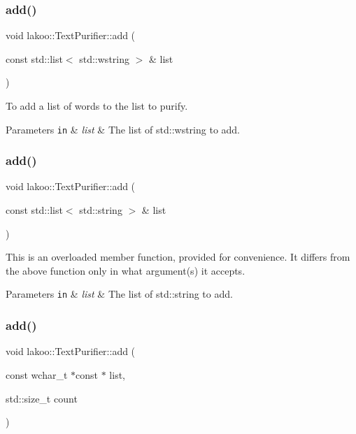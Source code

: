 \subsubsection{\texorpdfstring{add()}{add()}\hspace{0.1cm}{\footnotesize\ttfamily [5/8]}}
{\footnotesize\ttfamily void lakoo\+::\+Text\+Purifier\+::add (\begin{DoxyParamCaption}\item[{const std\+::list$<$ std\+::wstring $>$ \&}]{list }\end{DoxyParamCaption})}



To add a list of words to the list to purify. 


\begin{DoxyParams}[1]{Parameters}
\mbox{\tt in}  & {\em list} & The list of std\+::wstring to add. \\
\hline
\end{DoxyParams}
\mbox{\label{classlakoo_1_1_text_purifier_ab5329c055bac1d28a85e16c90bab12d9}} 
\subsubsection{\texorpdfstring{add()}{add()}\hspace{0.1cm}{\footnotesize\ttfamily [6/8]}}
{\footnotesize\ttfamily void lakoo\+::\+Text\+Purifier\+::add (\begin{DoxyParamCaption}\item[{const std\+::list$<$ std\+::string $>$ \&}]{list }\end{DoxyParamCaption})}

This is an overloaded member function, provided for convenience. It differs from the above function only in what argument(s) it accepts. 
\begin{DoxyParams}[1]{Parameters}
\mbox{\tt in}  & {\em list} & The list of std\+::string to add. \\
\hline
\end{DoxyParams}
\mbox{\label{classlakoo_1_1_text_purifier_a18c9fc28060bb7e75dfcd88a277a2cbb}} 
\subsubsection{\texorpdfstring{add()}{add()}\hspace{0.1cm}{\footnotesize\ttfamily [7/8]}}
{\footnotesize\ttfamily void lakoo\+::\+Text\+Purifier\+::add (\begin{DoxyParamCaption}\item[{const wchar\+\_\+t $\ast$const $\ast$}]{list,  }\item[{std\+::size\+\_\+t}]{count }\end{DoxyParamCaption})}


